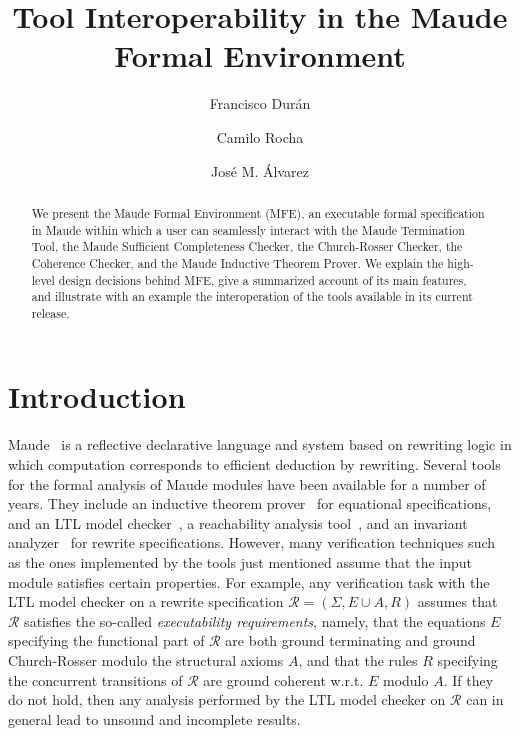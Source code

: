 \documentclass{llncs}
\title{Tool Interoperability in the
Maude Formal Environment}
\author{Francisco Dur\'an\inst{1} \and Camilo Rocha\inst{2} \and Jos\'e M. \'Alvarez\inst{1}}
\institute{
Universidad de M\'alaga, Spain. %
\and
University of Illinois at Urbana-Champaign, IL, USA. %
}
\newcommand{\rcal}{\mathcal{R}}
\begin{document}
\maketitle

\begin{abstract}
We present the Maude Formal Environment (MFE), 
an executable formal specification in Maude within which a 
user can seamlessly interact with the Maude Termination Tool,
the Maude Sufficient Completeness Checker, the Church-Rosser
Checker, the Coherence Checker, and the Maude Inductive
Theorem Prover.
We explain the high-level design decisions behind MFE,
give a summarized account of its main features, and
illustrate with an example the interoperation of
the tools available in its current release.
\end{abstract}

\section{Introduction}

Maude~\cite{CDELMMT:2007-book} is a reflective declarative 
language and system based on rewriting logic in which computation
corresponds to efficient deduction by rewriting.
Several tools for the formal analysis of Maude modules
have been available for a number of years. They include
an inductive theorem prover~\cite{Clavel-Palomino-Riesco:2006}
for equational specifications,
and an LTL model checker~\cite{Eker-Meseguer-Sridharanarayanan:02},
a reachability analysis tool~\cite{CDELMMT:2007-book},
and an invariant analyzer~\cite{Rocha-Meseguer:2011-tr}
for rewrite specifications.
However, many verification techniques such as the ones
implemented by the tools just mentioned assume that the input
module satisfies certain properties. For example, any verification
task with the LTL model checker on a rewrite specification 
$\rcal = (\Sigma,E\cup A,R)$ assumes that $\rcal$ satisfies the
so-called {\em executability requirements}, namely, that
the equations $E$ specifying the functional part 
of $\rcal$ are both ground terminating and ground
Church-Rosser modulo the structural axioms $A$, and
that the rules $R$ specifying the concurrent transitions
of $\rcal$ are ground coherent w.r.t. $E$ modulo $A$.
If they do not hold, 
then any analysis performed by the LTL model checker on $\rcal$
can in general lead to unsound and incomplete results.
\end{document}
